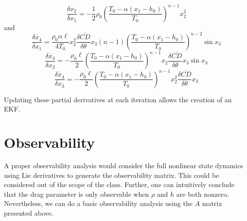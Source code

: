 \documentclass{article}
\begin{document}
  \begin{equation}
    \frac{\delta \dot{x_2}}{\delta x_5} = -\frac{1}{2}\rho_0 \left( \frac{T_0-\alpha \left( x_1 - h_0\right)}{T_0} \right)^{n-1} x_2^2
  \end{equation}
  and
  \begin{equation}
    \frac{\delta \dot{x_4}}{\delta x_1} = \frac{\rho_0 \alpha \ell}{4 T_0}x_2^2 \frac{\delta \bar{CD}}{\delta \theta} x_3 \left(n-1 \right) \left( \frac{T_0-\alpha \left( x_1 - h_0\right)}{T_0} \right)^{n-2} \sin x_3
  \end{equation}
  \begin{equation}
    \frac{\delta \dot{x_4}}{\delta x_2} = -\frac{\rho_0 \ell}{2}\left( \frac{T_0-\alpha \left( x_1 - h_0\right)}{T_0} \right)^{n-1} x_2 \frac{\delta \bar{CD}}{\delta \theta} x_3 \sin x_3
  \end{equation}
  \begin{equation}
    \frac{\delta \dot{x_4}}{\delta x_3} = -\frac{\rho_0 \ell}{2}\left( \frac{T_0-\alpha \left( x_1 - h_0\right)}{T_0} \right)^{n-1} x_2^2 \frac{\delta \bar{CD}}{\delta \theta} x_3
  \end{equation}

  Updating these partial derivatives at each iteration allows the creation of an EKF.

  \section{Observability}

  A proper observability analysis would consider the full nonlinear state dynamics using Lie derivatives to generate the observability matrix. This could be considered out of the scope of the class. Further, one can intuitively conclude that the drag parameter is only observable when $\rho$ and $\dot{h}$ are both nonzero. Nevertheless, we can do a basic observability analysis using the $A$ matrix presented above.
\end{document}
